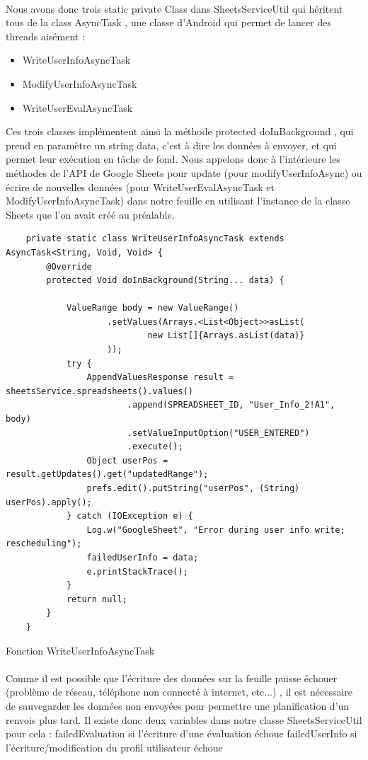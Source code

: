 \documentclass[a4paper, 10pt]{article}
\begin{document}
\paragraph{}
Nous avons donc trois static private Class dans SheetsServiceUtil qui héritent tous de la class AsyncTask , une classe d’Android qui permet de lancer des threads aisément : 
 \begin{itemize}
\item WriteUserInfoAsyncTask
\item ModifyUserInfoAsyncTask
\item WriteUserEvalAsyncTask
\end{itemize}
Ces trois classes implémentent ainsi la méthode protected doInBackground , qui prend en paramètre un string data, c’est à dire les données à envoyer, et qui permet leur exécution en tâche de fond.
Nous appelons donc à l'intérieure les méthodes de l’API de Google Sheets pour update (pour modifyUserInfoAsync) 
ou écrire de nouvelles données (pour WriteUserEvalAsyncTask et ModifyUserInfoAsyncTask) dans notre feuille en utilisant l’instance de la classe Sheets que l’on avait créé au préalable.
\hfill \break 
\begin{lstlisting}
    private static class WriteUserInfoAsyncTask extends AsyncTask<String, Void, Void> {
        @Override
        protected Void doInBackground(String... data) {

            ValueRange body = new ValueRange()
                    .setValues(Arrays.<List<Object>>asList(
                            new List[]{Arrays.asList(data)}
                    ));
            try {
            	AppendValuesResponse result = sheetsService.spreadsheets().values()
                        .append(SPREADSHEET_ID, "User_Info_2!A1", body)
                        .setValueInputOption("USER_ENTERED")
                        .execute();
            	Object userPos = result.getUpdates().get("updatedRange");
                prefs.edit().putString("userPos", (String) userPos).apply();
            } catch (IOException e) {
                Log.w("GoogleSheet", "Error during user info write; rescheduling");
                failedUserInfo = data;
                e.printStackTrace();
            }
            return null;
        }
    }
\end{lstlisting}
Fonction WriteUserInfoAsyncTask
\paragraph{}
Comme il est possible que l’écriture des données sur la feuille puisse échouer (problème de réseau, téléphone non connecté à internet, etc...) , il est nécessaire de sauvegarder les données non envoyées pour permettre une planification d’un renvois plus tard. Il existe donc deux variables dans notre classe SheetsServiceUtil pour cela : 
failedEvaluation si l’écriture d’une évaluation échoue
failedUserInfo si l’écriture/modification du profil utilisateur échoue
\end{document}
